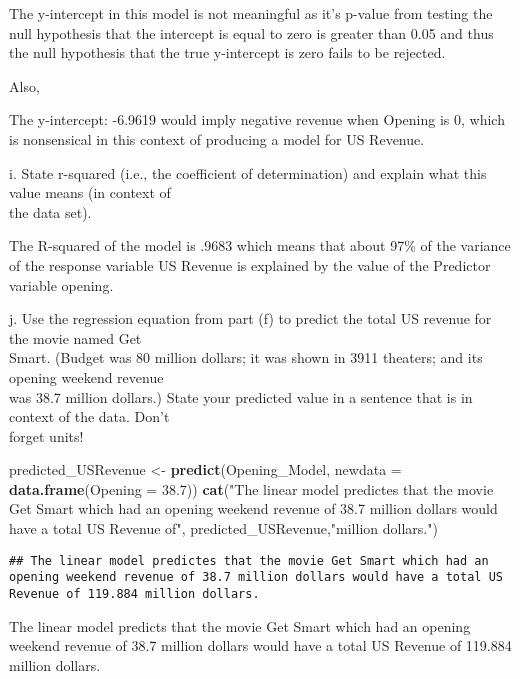 \documentclass[
]{article}
\newenvironment{Shaded}{\begin{snugshade}}{\end{snugshade}}
\newcommand{\AttributeTok}[1]{\textcolor[rgb]{0.13,0.29,0.53}{#1}}
\newcommand{\FloatTok}[1]{\textcolor[rgb]{0.00,0.00,0.81}{#1}}
\newcommand{\FunctionTok}[1]{\textcolor[rgb]{0.13,0.29,0.53}{\textbf{#1}}}
\newcommand{\NormalTok}[1]{#1}
\newcommand{\OtherTok}[1]{\textcolor[rgb]{0.56,0.35,0.01}{#1}}
\newcommand{\StringTok}[1]{\textcolor[rgb]{0.31,0.60,0.02}{#1}}
\begin{document}
The y-intercept in this model is not meaningful as it's p-value from
testing the null hypothesis that the intercept is equal to zero is
greater than 0.05 and thus the null hypothesis that the true y-intercept
is zero fails to be rejected.

Also,

The y-intercept: -6.9619 would imply negative revenue when Opening is 0,
which is nonsensical in this context of producing a model for US
Revenue.

\hfill\break
i. State r-squared (i.e., the coefficient of determination) and explain
what this value means (in context of\\
the data set).

The R-squared of the model is .9683 which means that about 97\% of the
variance of the response variable US Revenue is explained by the value
of the Predictor variable opening.

\hfill\break
j. Use the regression equation from part (f) to predict the total US
revenue for the movie named Get\\
Smart. (Budget was 80 million dollars; it was shown in 3911 theaters;
and its opening weekend revenue\\
was 38.7 million dollars.) State your predicted value in a sentence that
is in context of the data. Don't\\
forget units!

\begin{Shaded}
\begin{Highlighting}[]
\NormalTok{predicted\_USRevenue }\OtherTok{\textless{}{-}} \FunctionTok{predict}\NormalTok{(Opening\_Model, }\AttributeTok{newdata =} \FunctionTok{data.frame}\NormalTok{(}\AttributeTok{Opening =} \FloatTok{38.7}\NormalTok{))}
\FunctionTok{cat}\NormalTok{(}\StringTok{"The linear model predictes that the movie Get Smart which had an opening weekend revenue of 38.7 million dollars would have a total US Revenue of"}\NormalTok{, predicted\_USRevenue,}\StringTok{"million dollars."}\NormalTok{)}
\end{Highlighting}
\end{Shaded}

\begin{verbatim}
## The linear model predictes that the movie Get Smart which had an opening weekend revenue of 38.7 million dollars would have a total US Revenue of 119.884 million dollars.
\end{verbatim}

The linear model predicts that the movie Get Smart which had an opening
weekend revenue of 38.7 million dollars would have a total US Revenue of
119.884 million dollars.
\end{document}
